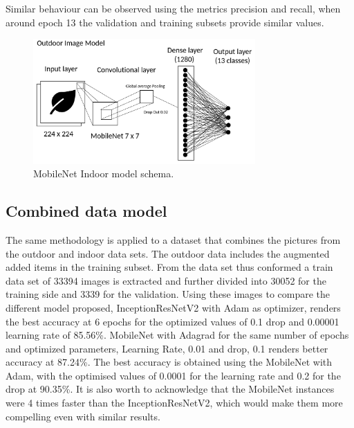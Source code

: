 \documentclass[conference]{IEEEtran}
\begin{document}
Similar behaviour can be observed using the metrics precision and recall, when around epoch 13 the validation and training subsets provide similar values.
 
\begin{figure}[htbp]
\centerline{\includegraphics[width=8.5cm]{ModelOutdoorsMobileNet.png}}
\caption{MobileNet Indoor model schema.}
\label{fig}
\end{figure}

\subsection{Combined data model}

The same methodology is applied to a dataset that combines the pictures from the outdoor and indoor data sets. The outdoor data includes the augmented added items in the training subset. From the data set thus conformed a train data set of 33394 images is extracted and further divided into 30052 for the training side and 3339 for the validation. Using these images to compare the different model proposed, InceptionResNetV2 with Adam as optimizer, renders the best accuracy at 6 epochs for the optimized values of 0.1 drop and 0.00001 learning rate of 85.56\%. MobileNet with Adagrad  for the same number of epochs and optimized parameters, Learning Rate, 0.01 and drop, 0.1 renders better accuracy at 87.24\%. The best accuracy is obtained using the MobileNet with Adam, with the optimised values of 0.0001 for the learning rate and 0.2 for the drop at 90.35\%. It is also worth to acknowledge that the MobileNet instances were 4 times faster than the InceptionResNetV2, which would make them more compelling even with similar results. \
\end{document}
